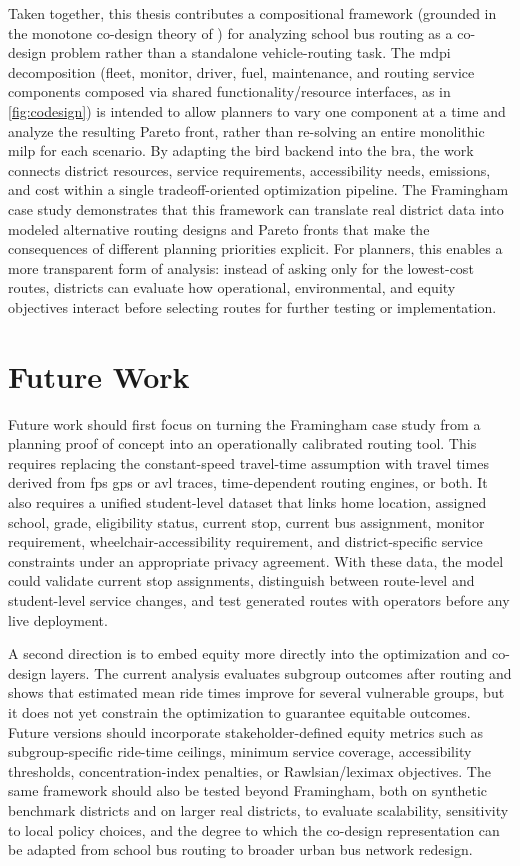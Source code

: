 Taken together, this thesis contributes a compositional framework (grounded in the monotone co-design theory of \textcite{censi2016Mathematical}) for analyzing school bus routing as a co-design problem rather than a standalone vehicle-routing task. The \gls{mdpi} decomposition (fleet, monitor, driver, fuel, maintenance, and routing service components composed via shared functionality/resource interfaces, as in \autoref{fig:codesign}) is intended to allow planners to vary one component at a time and analyze the resulting Pareto front, rather than re-solving an entire monolithic \gls{milp} for each scenario. By adapting the \gls{bird} backend into the \gls{bra}, the work connects district resources, service requirements, accessibility needs, emissions, and cost within a single tradeoff-oriented optimization pipeline. The Framingham case study demonstrates that this framework can translate real district data into modeled alternative routing designs and Pareto fronts that make the consequences of different planning priorities explicit. For planners, this enables a more transparent form of analysis: instead of asking only for the lowest-cost routes, districts can evaluate how operational, environmental, and equity objectives interact before selecting routes for further testing or implementation.

\section{Future Work}

Future work should first focus on turning the Framingham case study from a planning proof of concept into an operationally calibrated routing tool. This requires replacing the constant-speed travel-time assumption with travel times derived from \gls{fps} \gls{gps} or \gls{avl} traces, time-dependent routing engines, or both. It also requires a unified student-level dataset that links home location, assigned school, grade, eligibility status, current stop, current bus assignment, monitor requirement, wheelchair-accessibility requirement, and district-specific service constraints under an appropriate privacy agreement. With these data, the model could validate current stop assignments, distinguish between route-level and student-level service changes, and test generated routes with operators before any live deployment.

A second direction is to embed equity more directly into the optimization and co-design layers. The current analysis evaluates subgroup outcomes after routing and shows that estimated mean ride times improve for several vulnerable groups, but it does not yet constrain the optimization to guarantee equitable outcomes. Future versions should incorporate stakeholder-defined equity metrics such as subgroup-specific ride-time ceilings, minimum service coverage, accessibility thresholds, concentration-index penalties, or Rawlsian/leximax objectives. The same framework should also be tested beyond Framingham, both on synthetic benchmark districts and on larger real districts, to evaluate scalability, sensitivity to local policy choices, and the degree to which the co-design representation can be adapted from school bus routing to broader urban bus network redesign.